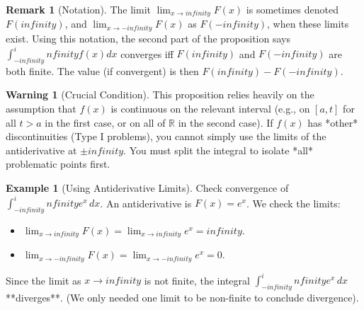 \documentclass[11pt]{article}
\def\infty{infinity}%
\theoremstyle{definition}
\newtheorem{example}[theorem]{Example}
\newtheorem{remark}[theorem]{Remark}
\newtheorem{warning}[theorem]{Warning} %
\newcommand{\dx}{\, dx} %
\newcommand{\R}{\mathbb{R}} %
\begin{document}
\begin{remark}[Notation]
    The limit $\lim_{x \to \infty} F(x)$ is sometimes denoted $F(\infty)$, and $\lim_{x \to -\infty} F(x)$ as $F(-\infty)$, when these limits exist. Using this notation, the second part of the proposition says $\int_{-\infty}^\infty f(x) dx$ converges iff $F(\infty)$ and $F(-\infty)$ are both finite. The value (if convergent) is then $F(\infty) - F(-\infty)$.
\end{remark}

\begin{warning}[Crucial Condition]
    This proposition relies heavily on the assumption that $f(x)$ is continuous on the relevant interval (e.g., on $[a, t]$ for all $t>a$ in the first case, or on all of $\R$ in the second case). If $f(x)$ has *other* discontinuities (Type I problems), you cannot simply use the limits of the antiderivative at $\pm \infty$. You must split the integral to isolate *all* problematic points first.
\end{warning}

\begin{example}[Using Antiderivative Limits]
    Check convergence of $\int_{-\infty}^\infty e^x \dx$.
    An antiderivative is $F(x) = e^x$.
    We check the limits:
    \begin{itemize}
        \item $\lim_{x \to \infty} F(x) = \lim_{x \to \infty} e^x = \infty$.
        \item $\lim_{x \to -\infty} F(x) = \lim_{x \to -\infty} e^x = 0$.
    \end{itemize}
    Since the limit as $x \to \infty$ is not finite, the integral $\int_{-\infty}^\infty e^x \dx$ **diverges**. (We only needed one limit to be non-finite to conclude divergence).
\end{example}
\end{document}
